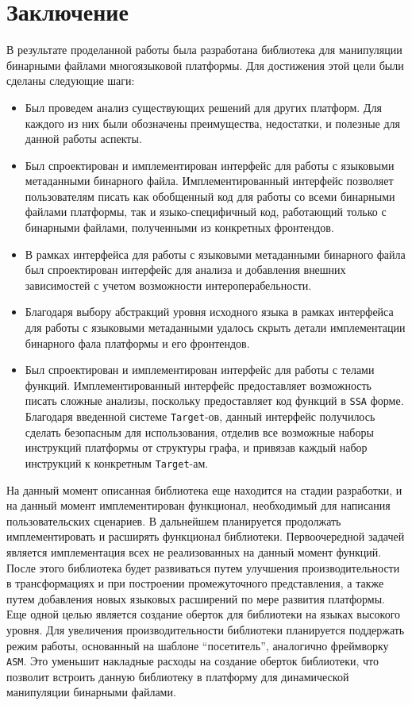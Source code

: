 \section{Заключение}
\label{sec:Chapter5} 

\sloppy

В результате проделанной работы была разработана библиотека для манипуляции бинарными файлами многоязыковой платформы. Для достижения этой цели были сделаны следующие шаги:

\begin{itemize}
    \item Был проведем анализ существующих решений для других платформ. Для каждого из них были обозначены преимущества, недостатки, и полезные для данной работы аспекты.
    \item Был спроектирован и имплементирован интерфейс для работы с языковыми метаданными бинарного файла. Имплементированный интерфейс позволяет пользователям писать как обобщенный код для работы со всеми бинарными файлами платформы, так и языко-специфичный код, работающий только с бинарными файлами, полученными из конкретных фронтендов.
    \item В рамках интерфейса для работы с языковыми метаданными бинарного файла был спроектирован интерфейс для анализа и добавления внешних зависимостей с учетом возможности интероперабельности.
    \item Благодаря выбору абстракций уровня исходного языка в рамках интерфейса для работы с языковыми метаданными удалось скрыть детали имплементации бинарного фала платформы и его фронтендов.
    \item Был спроектирован и имплементирован интерфейс для работы с телами функций. Имплементированный интерфейс предоставляет возможность писать сложные анализы, поскольку предоставляет код функций в \texttt{SSA} форме. Благодаря введенной системе \texttt{Target}-ов, данный интерфейс получилось сделать безопасным для использования, отделив все возможные наборы инструкций платформы от структуры графа, и привязав каждый набор инструкций к конкретным \texttt{Target}-ам.
\end{itemize}

На данный момент описанная библиотека еще находится на стадии разработки, и на данный момент имплементирован функционал, необходимый для написания пользовательских сценариев. В дальнейшем планируется продолжать имплементировать и расширять функционал библиотеки. Первоочередной задачей является имплементация всех не реализованных на данный момент функций. После этого библиотека будет развиваться путем улучшения производительности в трансформациях и при построении промежуточного представления, а также путем добавления новых языковых расширений по мере развития платформы. Еще одной целью является создание оберток для библиотеки на языках высокого уровня. Для увеличения производительности библиотеки планируется поддержать режим работы, основанный на шаблоне ``посетитель'', аналогично фреймворку \texttt{ASM}. Это уменьшит накладные расходы на создание оберток библиотеки, что позволит встроить данную библиотеку в платформу для динамической манипуляции бинарными файлами.

\newpage

